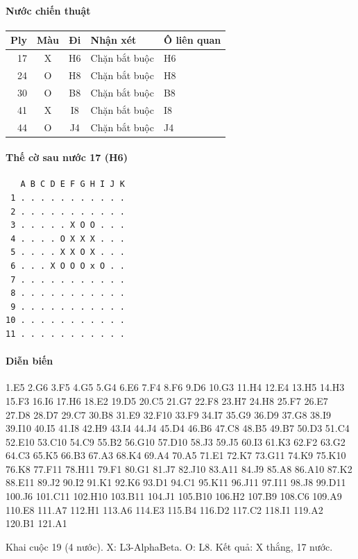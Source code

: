\paragraph{Nước chiến thuật}
\begin{center}\small
\begin{tabular}{@{}rccll@{}}
\toprule
Ply & Màu & Đi & Nhận xét & Ô liên quan \\
\midrule
17 & X & H6 & Chặn bắt buộc & H6 \\
24 & O & H8 & Chặn bắt buộc & H8 \\
30 & O & B8 & Chặn bắt buộc & B8 \\
41 & X & I8 & Chặn bắt buộc & I8 \\
44 & O & J4 & Chặn bắt buộc & J4 \\
\bottomrule
\end{tabular}
\end{center}
\paragraph{Thế cờ sau nước 17 (H6)}
\begin{verbatim}
   A B C D E F G H I J K
 1 . . . . . . . . . . .
 2 . . . . . . . . . . .
 3 . . . . . X O O . . .
 4 . . . . O X X X . . .
 5 . . . . X X O X . . .
 6 . . . X O O O x O . .
 7 . . . . . . . . . . .
 8 . . . . . . . . . . .
 9 . . . . . . . . . . .
10 . . . . . . . . . . .
11 . . . . . . . . . . .
\end{verbatim}
\paragraph{Diễn biến}
{\footnotesize 1.E5 2.G6 3.F5 4.G5 5.G4 6.E6 7.F4 8.F6 9.D6 10.G3 11.H4 12.E4 13.H5 14.H3 15.F3 16.I6 17.H6 18.E2 19.D5 20.C5 21.G7 22.F8 23.H7 24.H8 25.F7 26.E7 27.D8 28.D7 29.C7 30.B8 31.E9 32.F10 33.F9 34.I7 35.G9 36.D9 37.G8 38.I9 39.I10 40.I5 41.I8 42.H9 43.I4 44.J4 45.D4 46.B6 47.C8 48.B5 49.B7 50.D3 51.C4 52.E10 53.C10 54.C9 55.B2 56.G10 57.D10 58.J3 59.J5 60.I3 61.K3 62.F2 63.G2 64.C3 65.K5 66.B3 67.A3 68.K4 69.A4 70.A5 71.E1 72.K7 73.G11 74.K9 75.K10 76.K8 77.F11 78.H11 79.F1 80.G1 81.J7 82.J10 83.A11 84.J9 85.A8 86.A10 87.K2 88.E11 89.J2 90.I2 91.K1 92.K6 93.D1 94.C1 95.K11 96.J11 97.I11 98.J8 99.D11 100.J6 101.C11 102.H10 103.B11 104.J1 105.B10 106.H2 107.B9 108.C6 109.A9 110.E8 111.A7 112.H1 113.A6 114.E3 115.B4 116.D2 117.C2 118.I1 119.A2 120.B1 121.A1\par}
Khai cuộc 19 (4 nước). X: L3-AlphaBeta. O: L8. Kết quả: X thắng, 17 nước.
